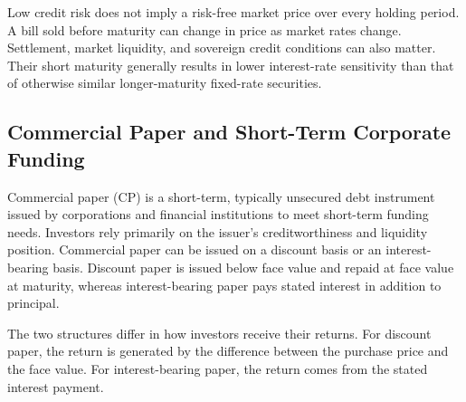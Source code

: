 Low credit risk does not imply a risk-free market price over every holding period. A bill sold before maturity can change in price as market rates change. Settlement, market liquidity, and sovereign credit conditions can also matter. Their short maturity generally results in lower interest-rate sensitivity than that of otherwise similar longer-maturity fixed-rate securities.

\subsection{Commercial Paper and Short-Term Corporate Funding}

Commercial paper (CP) is a short-term, typically unsecured
debt instrument issued by corporations and financial
institutions to meet short-term funding needs. Investors
rely primarily on the issuer's creditworthiness and
liquidity position. Commercial paper can be issued on
a discount basis or an interest-bearing basis. Discount
paper is issued below face value and repaid at face
value at maturity, whereas interest-bearing paper pays
stated interest in addition to principal.

The two structures differ in how investors receive
their returns. For discount paper, the return is
generated by the difference between the purchase price
and the face value. For interest-bearing paper, the
return comes from the stated interest payment.

